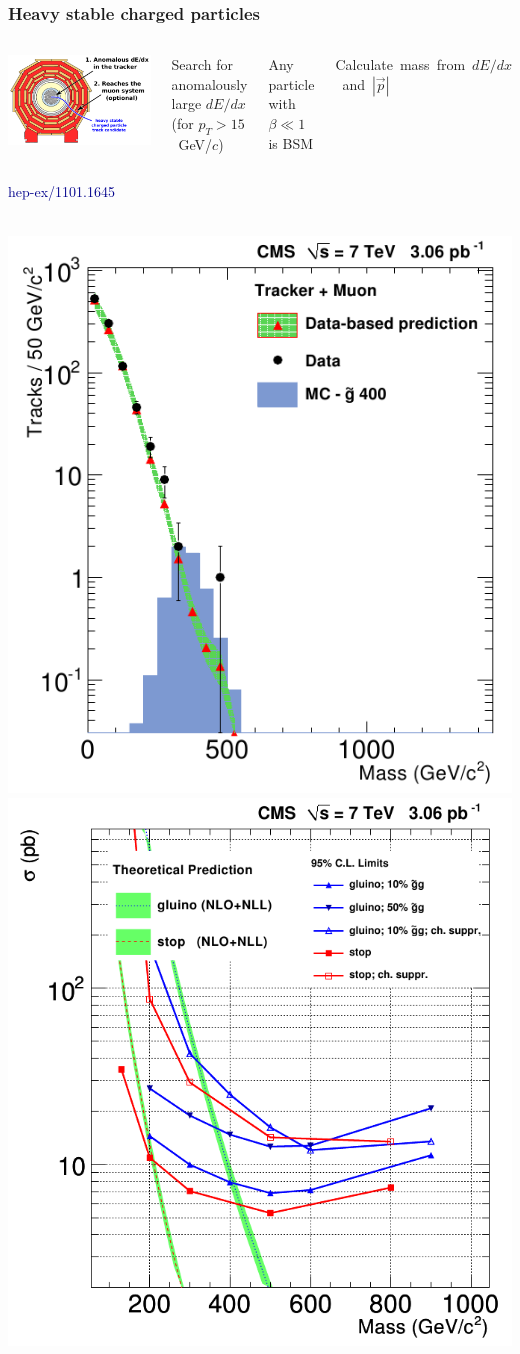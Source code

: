 \documentclass[compress]{beamer}
\begin{document}
\begin{frame}
\frametitle{Heavy stable charged particles}

\begin{columns}
\includegraphics[width=\linewidth]{figures/champ_explanation.pdf}

Search for anomalously large $dE/dx$ \\ (for $p_T > 15$~GeV/$c$)

\vspace{0.2 cm}
Any particle with $\beta \ll 1$ is BSM

\vspace{0.2 cm}
\mbox{Calculate mass from $dE/dx$ and $|\vec{p}|$\hspace{-1 cm}}
\end{columns}

\hfill \textcolor{darkblue}{\scriptsize hep-ex/1101.1645}

\mbox{ } \hfill \includegraphics[width=0.4\linewidth]{plots/champ_mass.png} \hfill \includegraphics[width=0.4\linewidth]{plots/champ_crosssection.png} \hfill \mbox{ }
\end{frame}
\end{document}
